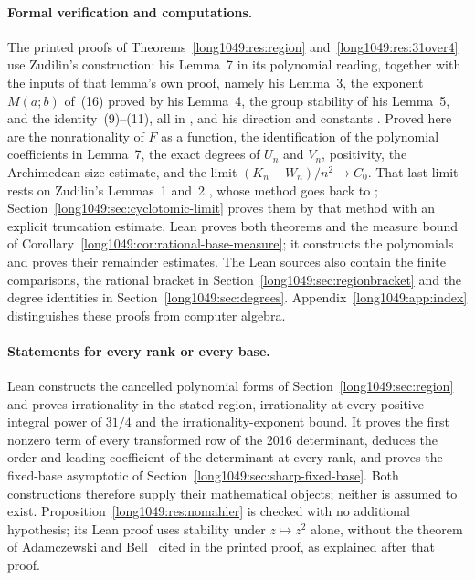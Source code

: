 \documentclass[11pt]{article}
\begin{document}
\paragraph{Formal verification and computations.}
The printed proofs of Theorems~\ref{long1049:res:region}
and~\ref{long1049:res:31over4} use Zudilin's construction: his Lemma~7 in its polynomial reading, together with the
inputs of that lemma's own proof, namely his Lemma~3, the exponent $M(a;b)$
of~(16) proved by his Lemma~4, the group stability of his Lemma~5, and the
identity~(9)--(11), all in \cite[pp.~156--161]{zudilin2004}, and his direction and
constants \cite[p.~162]{zudilin2004}.  Proved here are
the nonrationality of $F$ as a function, the identification of the
polynomial coefficients in Lemma~7, the exact degrees of $U_n$ and $V_n$,
positivity, the Archimedean size estimate, and the limit
$(K_n-W_n)/n^{2}\to C_0$.  That last limit rests on Zudilin's Lemmas~1 and~2
\cite[p.~155]{zudilin2004}, whose method goes back to
\cite[Lemma~1, p.~466]{zudilin2002}; Section~\ref{long1049:sec:cyclotomic-limit}
proves them by that method with an explicit truncation estimate.  Lean
proves both theorems and the measure bound of
Corollary~\ref{long1049:cor:rational-base-measure}; it constructs the
polynomials and proves their remainder estimates.  The Lean sources also
contain the finite comparisons, the rational bracket in
Section~\ref{long1049:sec:regionbracket} and the degree identities in
Section~\ref{long1049:sec:degrees}. Appendix~\ref{long1049:app:index}
distinguishes these proofs from computer algebra.

\paragraph{Statements for every rank or every base.}
Lean constructs the cancelled polynomial forms of
Section~\ref{long1049:sec:region} and proves irrationality in the
stated region, irrationality at every positive integral power of $31/4$
and the irrationality-exponent bound. It proves the first nonzero term
of every transformed row of the 2016 determinant, deduces the order and
leading coefficient of the determinant at every rank, and proves the
fixed-base asymptotic of Section~\ref{long1049:sec:sharp-fixed-base}.
Both constructions therefore supply their mathematical objects; neither
is assumed to exist. Proposition~\ref{long1049:res:nomahler} is checked
with no additional hypothesis; its Lean proof uses stability under
$z\mapsto z^2$ alone, without the theorem of Adamczewski and
Bell~\cite[Thm.~1.1, p.~6]{adamczewskibell2013} cited in the printed
proof, as explained after that proof.
\end{document}
